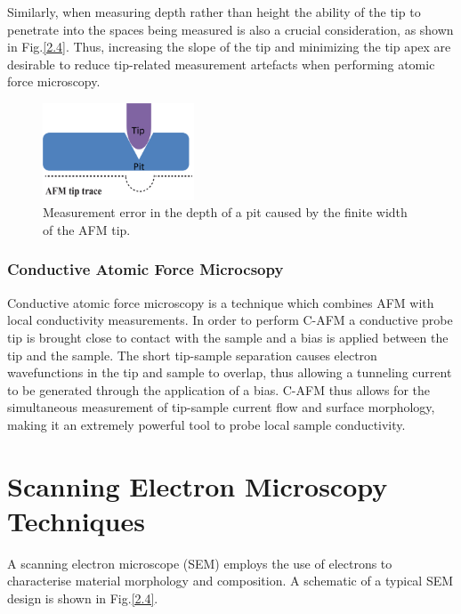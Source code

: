 Similarly, when measuring depth rather than height the ability of the tip to penetrate into the spaces being measured is also a crucial consideration, as shown in Fig.\ref{2.4}. Thus, increasing the slope of the tip and minimizing the tip apex are desirable to reduce tip-related measurement artefacts when performing atomic force microscopy.

\begin{figure}[h]
	\centering
	\includegraphics[width=0.4\textwidth]{Figs/Ch2/afm3.png}
	\caption {Measurement error in the depth of a pit caused by the finite width of the AFM tip.}
\end{figure}
\FloatBarrier

\subsubsection{Conductive Atomic Force Microcsopy}

Conductive atomic force microscopy  is a technique which combines AFM with local conductivity measurements. In order to perform C-AFM a conductive probe tip is brought close to contact with the sample and a bias is applied between the tip and the sample. The short tip-sample separation causes electron wavefunctions in the tip and sample to overlap, thus allowing a tunneling current to be generated through the application of a bias. C-AFM thus allows for the simultaneous measurement of tip-sample current flow and surface morphology, making it an extremely powerful tool to probe local sample conductivity. 




\section{Scanning Electron Microscopy Techniques}

A scanning electron microscope   (SEM) employs the use of electrons to characterise material morphology and composition. A schematic of a typical SEM design is shown in Fig.\ref{2.4}.

